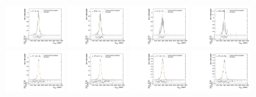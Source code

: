 \begin{figure}[htpb]
  \centering
  \includegraphics[width=0.2\textwidth]{fig/2Dfit/templateVsReco_GbuToWW2000_r0_MVV_mu_HP_bb_LDy_linear.pdf}
  \includegraphics[width=0.2\textwidth]{fig/2Dfit/templateVsReco_GbuToWW2000_r0_MVV_mu_LP_bb_LDy_linear.pdf}
  \includegraphics[width=0.2\textwidth]{fig/2Dfit/templateVsReco_GbuToWW2000_r0_MVV_mu_HP_bb_HDy_linear.pdf}
  \includegraphics[width=0.2\textwidth]{fig/2Dfit/templateVsReco_GbuToWW2000_r0_MVV_mu_LP_bb_HDy_linear.pdf}\\
  \includegraphics[width=0.2\textwidth]{fig/2Dfit/templateVsReco_GbuToWW2000_r0_MVV_mu_HP_nobb_LDy_linear.pdf}
  \includegraphics[width=0.2\textwidth]{fig/2Dfit/templateVsReco_GbuToWW2000_r0_MVV_mu_LP_nobb_LDy_linear.pdf}
  \includegraphics[width=0.2\textwidth]{fig/2Dfit/templateVsReco_GbuToWW2000_r0_MVV_mu_HP_nobb_HDy_linear.pdf}
  \includegraphics[width=0.2\textwidth]{fig/2Dfit/templateVsReco_GbuToWW2000_r0_MVV_mu_LP_nobb_HDy_linear.pdf}\\

\end{figure}

